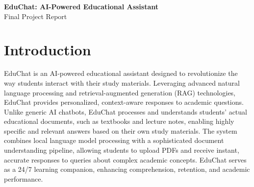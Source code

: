 \documentclass[12pt]{article}
\begin{document}
\begin{center}
    \LARGE \textbf{EduChat: AI-Powered Educational Assistant}\\[1em]
    \large Final Project Report\\[2em]
\end{center}

\section{Introduction}
EduChat is an AI-powered educational assistant designed to revolutionize the way students interact with their study materials. Leveraging advanced natural language processing and retrieval-augmented generation (RAG) technologies, EduChat provides personalized, context-aware responses to academic questions. Unlike generic AI chatbots, EduChat processes and understands students' actual educational documents, such as textbooks and lecture notes, enabling highly specific and relevant answers based on their own study materials. The system combines local language model processing with a sophisticated document understanding pipeline, allowing students to upload PDFs and receive instant, accurate responses to queries about complex academic concepts. EduChat serves as a 24/7 learning companion, enhancing comprehension, retention, and academic performance.
\end{document}

